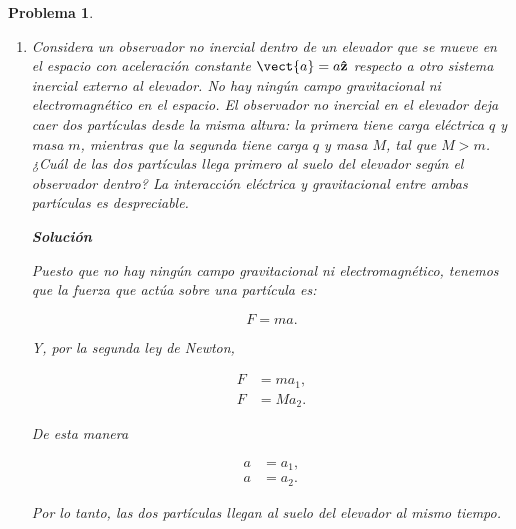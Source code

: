 \documentclass[12pt]{article}
\theoremstyle{break}
\newtheorem{exercise}{Problema}
\theoremstyle{nonumberbreak}
\DeclareRobustCommand{\uvec}[1]{{%
  \ifcsname uvec#1\endcsname
     \csname uvec#1\endcsname
   \else
    \bm{\hat{\mathbf{#1}}}%
   \fi
}}%
\newcommand*{\inlinesol}{\vspace*{10pt}\textbf{Solución}\vspace*{10pt}}
\begin{document}
\begin{exercise}
\begin{enumerate}[label = \alph*)]
            \begin{align}
                mg &= ma_{1},\nonumber\\
                \Aboxed{\therefore\ a_{1} &= g.}\label{eq:AccelarationForm}
            \end{align}

            Análogamente para la \cref{eq:NewtonForM},

            \begin{align}
                mg &= ma_{2},\nonumber\\
                \Aboxed{\therefore\ a_{2} &= g.}\label{eq:AccelarationForM}
            \end{align}

            De las \cref{eq:AccelarationForm,eq:AccelarationForM} podemos concluir que las partículas llegan al suelo del elevador al mismo tiempo.
            
            \item Considera un observador no inercial dentro de un elevador que se mueve en el espacio con aceleración constante \(\vect{a} = a\uvec{z}\) respecto a otro sistema inercial externo al elevador. No hay ningún campo gravitacional ni electromagnético en el espacio. El observador no inercial en el elevador deja caer dos partículas desde la misma altura: la primera tiene carga eléctrica \(q\) y masa \(m\), mientras que la segunda tiene carga \(q\) y masa \(M\), tal que \(M > m\). ¿Cuál de las dos partículas llega primero al suelo del elevador según el observador dentro? La interacción eléctrica y gravitacional entre ambas partículas es despreciable.
            
            \inlinesol

            Puesto que no hay ningún campo gravitacional ni electromagnético, tenemos que la fuerza que actúa sobre una partícula es:

            \begin{equation}
                F = ma.
                \label{eq:ForceWitha}
            \end{equation}

            Y, por la segunda ley de Newton,

            \begin{align*}
                F &= ma_{1},\\
                F &= Ma_{2}.
            \end{align*}

            De esta manera

            \begin{align*}
                a &= a_{1},\\
                a &= a_{2}.
            \end{align*}

            Por lo tanto, las dos partículas llegan al suelo del elevador al mismo tiempo.
            
        \end{enumerate}
    \end{exercise}
\end{document}
